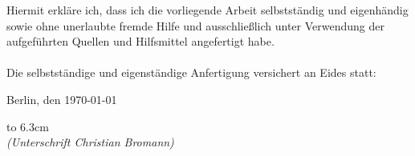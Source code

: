 \newpage
\thispagestyle{empty}
\newcommand\dotline[2][.5em]{\leavevmode\hbox to #2{\dotfill{}\hfil}}

\begin{large}
\vspace*{6cm}

\noindent
Hiermit erkläre ich, dass ich die vorliegende Arbeit selbstständig und eigenhändig sowie ohne unerlaubte fremde Hilfe und ausschließlich unter Verwendung der aufgeführten Quellen und Hilfsmittel angefertigt habe.\\
\\
Die selbstständige und eigenständige Anfertigung versichert an Eides statt:

\vspace{3cm}

\noindent
Berlin, den \today

\vspace{2cm}
\hspace*{-0.6cm}
\dotline{6.3cm}\\
\textit{(Unterschrift Christian Bromann)}

\end{large}
